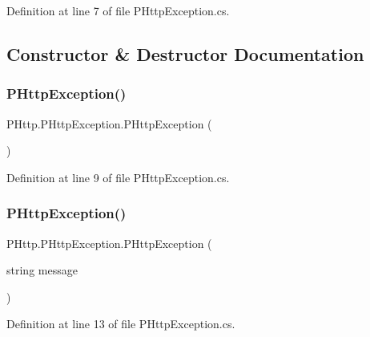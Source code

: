 Definition at line 7 of file P\+Http\+Exception.\+cs.



\subsection{Constructor \& Destructor Documentation}
\mbox{\label{class_p_http_1_1_p_http_exception_a37b72f2e0f121f2515473e55325b4e27}} 
\subsubsection{\texorpdfstring{P\+Http\+Exception()}{PHttpException()}\hspace{0.1cm}{\footnotesize\ttfamily [1/4]}}
{\footnotesize\ttfamily P\+Http.\+P\+Http\+Exception.\+P\+Http\+Exception (\begin{DoxyParamCaption}{ }\end{DoxyParamCaption})}



Definition at line 9 of file P\+Http\+Exception.\+cs.

\mbox{\label{class_p_http_1_1_p_http_exception_a91948b6fb1be46bfddd6ba3e770ed235}} 
\subsubsection{\texorpdfstring{P\+Http\+Exception()}{PHttpException()}\hspace{0.1cm}{\footnotesize\ttfamily [2/4]}}
{\footnotesize\ttfamily P\+Http.\+P\+Http\+Exception.\+P\+Http\+Exception (\begin{DoxyParamCaption}\item[{string}]{message }\end{DoxyParamCaption})}



Definition at line 13 of file P\+Http\+Exception.\+cs.

